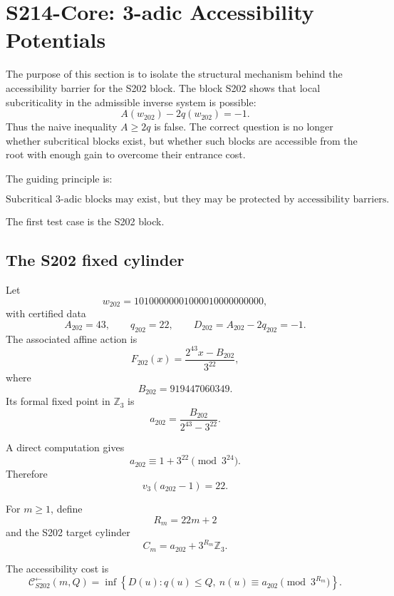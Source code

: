 
\section{S214-Core: 3-adic Accessibility Potentials}
\label{sec:S214-core}

The purpose of this section is to isolate the structural mechanism behind
the accessibility barrier for the S202 block. The block S202 shows that
local subcriticality in the admissible inverse system is possible:
\[
A(w_{202})-2q(w_{202})=-1.
\]
Thus the naive inequality \(A\ge 2q\) is false. The correct question is no
longer whether subcritical blocks exist, but whether such blocks are
accessible from the root with enough gain to overcome their entrance cost.

The guiding principle is:

\[
\boxed{
\text{Subcritical }3\text{-adic blocks may exist, but they may be protected
by accessibility barriers.}
}
\]

The first test case is the S202 block.

\subsection{The S202 fixed cylinder}
\label{subsec:S202-cylinder}

Let
\[
w_{202}=10100000001000010000000000,
\]
with certified data
\[
A_{202}=43,\qquad q_{202}=22,\qquad D_{202}=A_{202}-2q_{202}=-1.
\]
The associated affine action is
\[
F_{202}(x)=\frac{2^{43}x-B_{202}}{3^{22}},
\]
where
\[
B_{202}=919447060349.
\]
Its formal fixed point in \(\mathbb Z_3\) is
\[
a_{202}
=
\frac{B_{202}}{2^{43}-3^{22}}.
\]

A direct computation gives
\[
a_{202}\equiv 1+3^{22}\pmod{3^{24}}.
\]
Therefore
\[
v_3(a_{202}-1)=22.
\]

For \(m\ge1\), define
\[
R_m=22m+2
\]
and the S202 target cylinder
\[
C_m
=
a_{202}+3^{R_m}\mathbb Z_3.
\]

The accessibility cost is
\[
\mathcal C^{\leftarrow}_{S202}(m,Q)
=
\inf
\left\{
D(u):
q(u)\le Q,\
n(u)\equiv a_{202}\pmod{3^{R_m}}
\right\}.
\]

